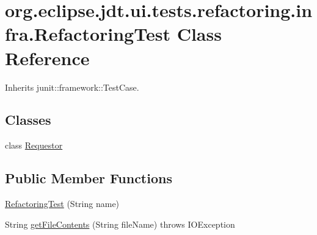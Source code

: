\hypertarget{classorg_1_1eclipse_1_1jdt_1_1ui_1_1tests_1_1refactoring_1_1infra_1_1RefactoringTest}{
\section{org.eclipse.jdt.ui.tests.refactoring.infra.RefactoringTest Class Reference}
\label{classorg_1_1eclipse_1_1jdt_1_1ui_1_1tests_1_1refactoring_1_1infra_1_1RefactoringTest}
}


Inherits junit::framework::TestCase.

\subsection*{Classes}
\begin{DoxyCompactItemize}
\item 
class \hyperlink{classorg_1_1eclipse_1_1jdt_1_1ui_1_1tests_1_1refactoring_1_1infra_1_1RefactoringTest_1_1Requestor}{Requestor}
\end{DoxyCompactItemize}
\subsection*{Public Member Functions}
\begin{DoxyCompactItemize}
\item 
\hyperlink{classorg_1_1eclipse_1_1jdt_1_1ui_1_1tests_1_1refactoring_1_1infra_1_1RefactoringTest_a60f21ce723ed5daeb121d31c30fa161a}{RefactoringTest} (String name)
\item 
String \hyperlink{classorg_1_1eclipse_1_1jdt_1_1ui_1_1tests_1_1refactoring_1_1infra_1_1RefactoringTest_aa1f8477cadd0e12c902db43428d68434}{getFileContents} (String fileName)  throws IOException 
\end{DoxyCompactItemize}
